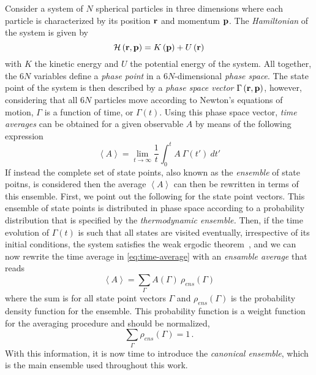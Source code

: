Consider a system of $N$ spherical particles in three dimensions
where each particle is characterized by its position $\mathbf{r}$ and momentum $\mathbf{p}$.
The \emph{Hamiltonian} of the system is given by
\begin{equation}
    \mathcal{H} \left( \mathbf{r}, \mathbf{p} \right) = 
    K \left( \mathbf{p} \right) + U \left( \mathbf{r} \right)
    \label{eq:hamiltonian}
\end{equation}
with $K$ the kinetic energy and $U$ the potential energy of the system.
All together, the 6$N$ variables define a \emph{phase point} in a 6$N$-dimensional
\emph{phase space}. The state point of the system is then described by a
\emph{phase space vector} $\Gamma \left( \mathbf{r}, \mathbf{p} \right)$, however, considering that all
6$N$ particles move according to Newton's equations of motion, $\Gamma$ is
a function of time, or $\Gamma(t)$. Using this phase space vector, \emph{time averages}
can be obtained for a given observable $A$ by means of the following expression
\begin{equation}
    \left< A \right> = \lim_{t \to \infty} \frac{1}{t} 
    \int_{0}^{t} A \: \Gamma(t') \: dt'
    \label{eq:time-average}
\end{equation}
If instead the complete set of state points, also known as the \emph{ensemble} of state
poitns, is considered then the average $\left< A \right>$ can then be rewritten in
terms of this ensemble. First, we point out the following for the state point vectors.
This ensemble of state points is distributed in phase space according to a probability 
distribution that is specified by the \emph{thermodynamic ensemble.} Then, if the time 
evolution of $\Gamma(t)$ is such that all states are visited eventually, irrespective of 
its initial conditions, the system satisfies the weak ergodic
theorem~\cite{kittelElementaryStatisticalPhysics2004},
and we can now rewrite the time average in \autoref{eq:time-average} with
an \emph{ensamble average} that reads
\begin{equation}
    \left< A \right> = \sum_{\Gamma} A(\Gamma) \: \rho_{ens} (\Gamma)
    \label{eq:ensemble-average}
\end{equation}
where the sum is for all state point vectors $\Gamma$ and $\rho_{ens} (\Gamma)$
is the probability density function for the ensemble. This probability function is
a weight function for the averaging procedure and should be normalized,
\begin{equation}
    \sum_{\Gamma} \rho_{ens} (\Gamma) = 1 \, .
    \label{eq:normalized}
\end{equation}
With this information, it is now time to introduce the \emph{canonical ensemble}, which
is the main ensemble used throughout this work.

